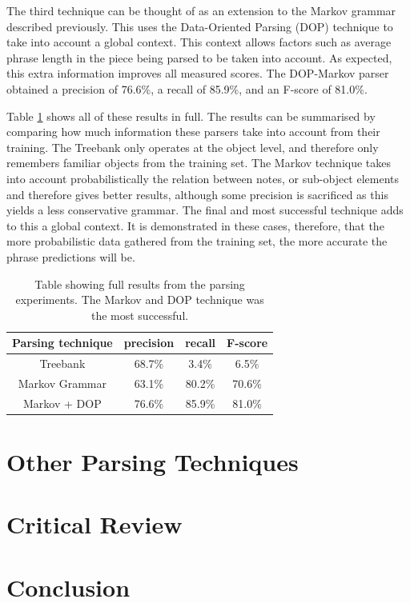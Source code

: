 \documentclass[a4paper,12pt]{article}
\begin{document}
The third technique can be thought of as an extension to the Markov grammar described previously. This uses the Data-Oriented Parsing (DOP) technique to take into account a global context. This context allows factors such as average phrase length in the piece being parsed to be taken into account. As expected, this extra information improves all measured scores. The DOP-Markov parser obtained a precision of 76.6\%, a recall of 85.9\%, and an F-score of 81.0\%. 

Table \ref{resulttab} shows all of these results in full. The results can be summarised by comparing how much information these parsers take into account from their training. The Treebank only operates at the object level, and therefore only remembers familiar objects from the training set. The Markov technique takes into account probabilistically the relation between notes, or sub-object elements and therefore gives better results, although some precision is sacrificed as this yields a less conservative grammar. The final and most successful technique adds to this a global context. It is demonstrated in these cases, therefore, that the more probabilistic data gathered from the training set, the more accurate the phrase predictions will be.

\begin{table}
\centering
\begin{tabular}{ |c|c|c|c| } 
 \hline
 Parsing technique & precision & recall & F-score \\ 
 \hline
 Treebank & 68.7\% & 3.4\% & 6.5\% \\ 
 Markov Grammar & 63.1\% & 80.2\% & 70.6\% \\ 
 Markov + DOP & 76.6\% & 85.9\% & 81.0\% \\ 

 \hline
\end{tabular}
\caption{Table showing full results from the parsing experiments. The Markov and DOP technique was the most successful.}
\label{resulttab}
\end{table}

\section{Other Parsing Techniques}



\section{Critical Review}

\section{Conclusion}



\end{document}

